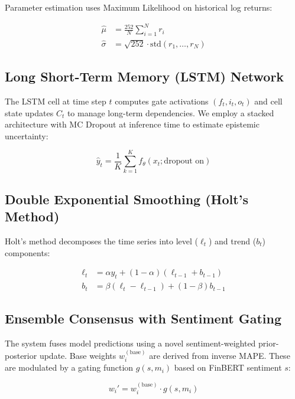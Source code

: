 \documentclass[conference]{IEEEtran}
\begin{document}
Parameter estimation uses Maximum Likelihood on historical log returns:

\begin{align}
    \hat{\mu} &= \frac{252}{N} \sum_{i=1}^{N} r_i \\
    \hat{\sigma} &= \sqrt{252} \cdot \text{std}(r_1, \ldots, r_N)
\end{align}

\subsection{Long Short-Term Memory (LSTM) Network}

The LSTM cell at time step $t$ computes gate activations $(f_t, i_t, o_t)$ 
and cell state updates $C_t$ to manage long-term dependencies. 
We employ a stacked architecture with MC Dropout at inference time to 
estimate epistemic uncertainty:

\begin{equation}
    \hat{y}_t = \frac{1}{K}\sum_{k=1}^K f_\theta(x_t; \text{dropout on})
\end{equation}

\subsection{Double Exponential Smoothing (Holt's Method)}

Holt's method decomposes the time series into level ($\ell_t$) and
trend ($b_t$) components:

\begin{align}
    \ell_t &= \alpha y_t + (1 - \alpha)(\ell_{t-1} + b_{t-1}) \\
    b_t &= \beta(\ell_t - \ell_{t-1}) + (1 - \beta) b_{t-1}
\end{align}

\subsection{Ensemble Consensus with Sentiment Gating}
\label{sec:ensemble}

The system fuses model predictions using a novel sentiment-weighted 
prior-posterior update. Base weights $w_i^{(\text{base})}$ are 
derived from inverse MAPE. These are modulated by a gating function 
$g(s, m_i)$ based on FinBERT sentiment $s$:

\begin{equation}
    w_i' = w_i^{(\text{base})} \cdot g(s, m_i)
\end{equation}
\end{document}
